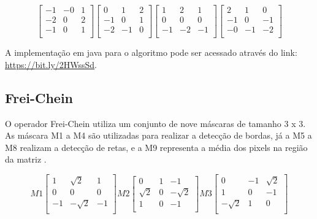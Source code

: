 \documentclass[
	12pt,				%
	oneside,			%
	a4paper,			%
	english,			%
	french,				%
	spanish,			%
	brazil,				%
	]{abntex2}
\begin{document}
\[
\begin{bmatrix}
    -1 & -0 &  1   \\ 
	-2 &  0 &  2   \\ 
	-1 &  0 &  1   \\ 
\end{bmatrix} 
\begin{bmatrix}
     0 &  1 &  2   \\ 
	-1 &  0 &  1   \\ 
	-2 & -1 &  0   \\ 
\end{bmatrix}
\begin{bmatrix}
     1 &  2 &  1   \\ 
	 0 &  0 &  0   \\ 
	-1 & -2 & -1   \\ 
\end{bmatrix} 
\begin{bmatrix}
     2 &  1 &  0   \\ 
	-1 &  0 & -1   \\ 
	-0 & -1 & -2   \\ 
\end{bmatrix}
\]

A implementação em java para o algoritmo pode ser acessado através do link: \url{https://bit.ly/2HWssSd}.

\subsection{Frei-Chein}
O operador Frei-Chein utiliza um conjunto de nove máscaras de tamanho 3 x 3. As máscara M1 a M4 são utilizadas para realizar a detecção de bordas, já a M5 a M8 realizam a detecção de retas, e a M9 representa a média dos pixels na região da matriz \cite{pedriniSchwartz:2008}. 

\[
M1
\begin{bmatrix}
     	 	 	 1 &  \sqrt{2} &  1         \\ 
	             0 &         0 &  0         \\ 
	            -1 & -\sqrt{2} & -1         \\ 
\end{bmatrix} 
M2
\begin{bmatrix}
     	     0 &             1 & -1         \\ 
	  \sqrt{2} &             0 & -\sqrt{2}  \\ 
	         1 &             0 & -1         \\ 
\end{bmatrix}
M3
\begin{bmatrix}
     	 	 0 &            -1 & \sqrt{2}   \\ 
	         1 &             0 & -1         \\ 
	 -\sqrt{2} &             1 &  0         \\ 
\end{bmatrix} 
\]
\end{document}
